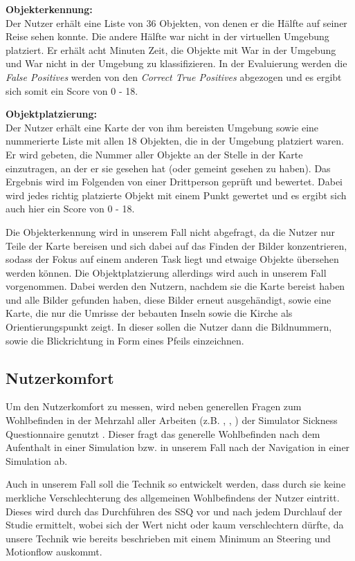 \textbf{Objekterkennung:}\\
Der Nutzer erhält eine Liste von 36 Objekten, von denen er die Hälfte auf seiner Reise sehen konnte. Die andere Hälfte war nicht in der virtuellen Umgebung platziert. Er erhält acht Minuten Zeit, die Objekte mit \glqq War in der Umgebung\grqq{} und \glqq War nicht in der Umgebung\grqq{} zu klassifizieren. In der Evaluierung werden die \textit{False Positives} werden von den \textit{Correct True Positives} abgezogen und es ergibt sich somit ein Score von 0 - 18.


\textbf{Objektplatzierung:}\\
Der Nutzer erhält eine Karte der von ihm bereisten Umgebung sowie eine nummerierte Liste mit allen 18 Objekten, die in der Umgebung platziert waren. 
Er wird gebeten, die Nummer aller Objekte an der Stelle in der Karte einzutragen, an der er sie gesehen hat (oder gemeint gesehen zu haben).
Das Ergebnis wird im Folgenden von einer Drittperson geprüft und bewertet.
Dabei wird jedes richtig platzierte Objekt mit einem Punkt gewertet und es ergibt sich auch hier ein Score von 0 - 18. 

Die Objekterkennung wird in unserem Fall nicht abgefragt, da die Nutzer nur Teile der Karte bereisen und sich dabei auf das Finden der Bilder konzentrieren, sodass der Fokus auf einem anderen Task liegt und etwaige Objekte übersehen werden können.
Die Objektplatzierung allerdings wird auch in unserem Fall vorgenommen. Dabei werden den Nutzern, nachdem sie die Karte bereist haben und alle Bilder gefunden haben, diese Bilder erneut ausgehändigt, sowie eine Karte, die nur die Umrisse der bebauten \glqq Inseln \grqq{} sowie die Kirche als Orientierungspunkt zeigt.
In dieser sollen die Nutzer dann die Bildnummern, sowie die Blickrichtung in Form eines Pfeils einzeichnen.


\subsection{Nutzerkomfort}
Um den Nutzerkomfort zu messen, wird neben generellen Fragen zum Wohlbefinden in der Mehrzahl aller Arbeiten (z.B. \cite{Krekhov2018GulliVR}, \cite{Suma2010EvaluationEnvironments}, \cite{Usoh1999WalkingEnvironments}) der Simulator Sickness Questionnaire genutzt \cite{Kennedy1993SimulatorSickness}. Dieser fragt das generelle Wohlbefinden nach dem Aufenthalt in einer Simulation bzw. in unserem Fall nach der Navigation in einer Simulation ab.

Auch in unserem Fall soll die Technik so entwickelt werden, dass durch sie keine merkliche Verschlechterung des allgemeinen Wohlbefindens der Nutzer eintritt. Dieses wird durch das Durchführen des SSQ vor und nach jedem Durchlauf der Studie ermittelt, wobei sich der Wert nicht oder kaum  verschlechtern dürfte, da unsere Technik wie bereits beschrieben mit einem Minimum an Steering und Motionflow auskommt.

